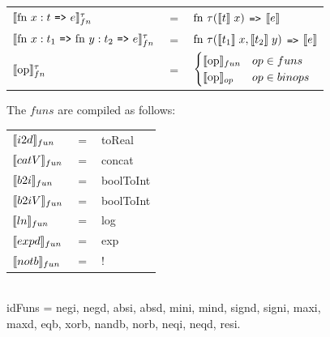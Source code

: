 \documentclass[11pt]{article}
\begin{document}
\begin{figure}
\begin{tabular}{l c l}
$\evals{ \text{fn } x:t $ {\tt =>} $ e}^{\tau}_{fn} $ & $=$ & $ \text{fn } \tau (\llbracket t \rrbracket\; x) $ {\tt =>} $ \llbracket e \rrbracket$\\
$\evals{ \text{fn } x:t_1$ {\tt =>} $\text{fn } y:t_2 $ {\tt =>} $ e}^{\tau}_{fn} $ & $=$ & $ \text{fn } \tau (\llbracket t_1 \rrbracket\; x, \llbracket t_2 \rrbracket \; y) $ {\tt =>} $ \llbracket e \rrbracket$\\
$\llbracket \text{op} \rrbracket^{\tau}_{fn}$ & = & $ \begin{cases} \llbracket \text{op} \rrbracket_{fun} & op \in funs \\ \llbracket \text{op} \rrbracket_{op} & op \in binops \end{cases}$
\end{tabular}
\end{figure}



\begin{figure}

The $funs$ are compiled as follows:\\
\begin{tabular}{l c l}
$\llbracket i2d \rrbracket_{fun}$ & $=$ & toReal\\ 
$\llbracket catV \rrbracket_{fun}$ & $=$ & concat\\ 
$\llbracket b2i \rrbracket_{fun}$ & $=$ & boolToInt\\ 
$\llbracket b2iV \rrbracket_{fun}$ & $=$ & boolToInt\\ 
$\llbracket ln \rrbracket_{fun}$ & $=$ & log\\ 
$\llbracket expd \rrbracket_{fun}$ & $=$ & exp\\ 
$\llbracket notb \rrbracket_{fun}$ & $=$ & !\\ 
\end{tabular}\\
idFuns = negi, negd, absi, absd, mini, mind, signd, signi, maxi, maxd, eqb, xorb, nandb, norb, neqi, neqd, resi.
\end{figure}
\end{document}
